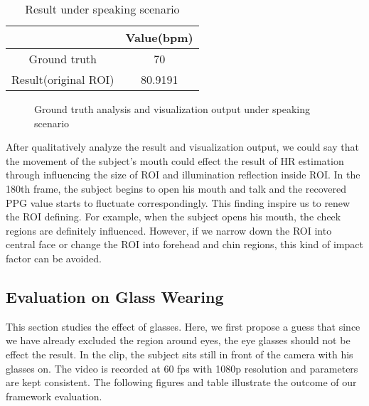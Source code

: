\begin{table}[htbp]
\centering
\caption{Result under speaking scenario} \label{tab:simpletable}
\begin{tabular}{|c|c|}
    \hline
     & Value(bpm) \\
    \hline
    Ground truth & 70 \\
    \hline
    Result(original ROI) & 80.9191 \\
    \hline
\end{tabular}
\end{table}

\begin{figure}[ht]
\hspace{-0.3in}
\caption{Ground truth analysis and visualization output under speaking scenario}\label{fig:noted-figure}
\end{figure}

After qualitatively analyze the result and visualization output, we could say that the movement of the subject's mouth could effect the result of HR estimation through influencing the size of ROI and illumination reflection inside ROI. In the 180th frame, the subject begins to open his mouth and talk and the recovered PPG value starts to fluctuate correspondingly. This finding inspire us to renew the ROI defining. For example, when the subject opens his mouth, the cheek regions are definitely influenced. However, if we narrow down the ROI into central face or change the ROI into forehead and chin regions, this kind of impact factor can be avoided. 

\subsection{Evaluation on Glass Wearing}
This section studies the effect of glasses. Here, we first propose a guess that since we have already excluded the region around eyes, the eye glasses should not be effect the result. In the clip, the subject sits still in front of the camera with his glasses on. The video is recorded at 60 fps with 1080p resolution and parameters are kept consistent. The following figures and table illustrate the outcome of our framework evaluation. 


